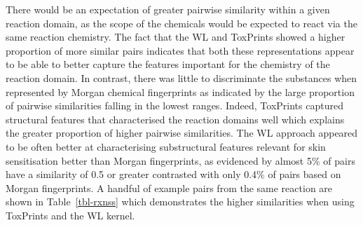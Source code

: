\documentclass[
  super,
  preprint,
  3p]{elsarticle}
\begin{document}
There would be an expectation of greater pairwise similarity within a
given reaction domain, as the scope of the chemicals would be expected
to react via the same reaction chemistry. The fact that the WL and
ToxPrints showed a higher proportion of more similar pairs indicates
that both these representations appear to be able to better capture the
features important for the chemistry of the reaction domain. In
contrast, there was little to discriminate the substances when
represented by Morgan chemical fingerprints as indicated by the large
proportion of pairwise similarities falling in the lowest ranges.
Indeed, ToxPrints captured structural features that characterised the
reaction domains well which explains the greater proportion of higher
pairwise similarities. The WL approach appeared to be often better at
characterising substructural features relevant for skin sensitisation
better than Morgan fingerprints, as evidenced by almost 5\% of pairs
have a similarity of 0.5 or greater contrasted with only 0.4\% of pairs
based on Morgan fingerprints. A handful of example pairs from the same
reaction are shown in Table~\ref{tbl-rxnss} which demonstrates the
higher similarities when using ToxPrints and the WL kernel.
\end{document}
